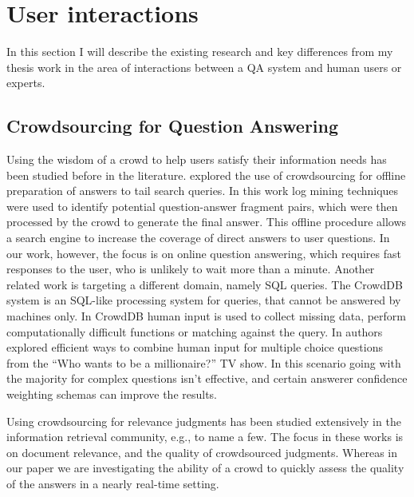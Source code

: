 \section{User interactions}
\label{sec:rel_work:user}

In this section I will describe the existing research and key differences from my thesis work in the area of interactions between a QA system and human users or experts.

\subsection{Crowdsourcing for Question Answering}
\label{sec:rel_work:user:crowdsourcing}

Using the wisdom of a crowd to help users satisfy their information needs has been studied before in the literature.
\cite{bernstein2012direct} explored the use of crowdsourcing for offline preparation of answers to tail search queries.
In this work log mining techniques were used to identify potential question-answer fragment pairs, which were then processed by the crowd to generate the final answer.
This offline procedure allows a search engine to increase the coverage of direct answers to user questions.
In our work, however, the focus is on online question answering, which requires fast responses to the user, who is unlikely to wait more than a minute.
Another related work is targeting a different domain, namely SQL queries.
The CrowdDB system \cite{franklin2011crowddb} is an SQL-like processing system for queries, that cannot be answered by machines only.
In CrowdDB human input is used to collect missing data, perform computationally difficult functions or matching against the query.
In \cite{aydin2014crowdsourcing} authors explored efficient ways to combine human input for multiple choice questions from the ``Who wants to be a millionaire?'' TV show.
In this scenario going with the majority for complex questions isn't effective, and certain answerer confidence weighting schemas can improve the results.  

Using crowdsourcing for relevance judgments has been studied extensively in the information retrieval community, e.g., \cite{Alonso:2008:CRE:1480506.1480508,alonso2011design,grady2010crowdsourcing} to name a few.
The focus in these works is on document relevance, and the quality of crowdsourced judgments.
Whereas in our paper we are investigating the ability of a crowd to quickly assess the quality of the answers in a nearly real-time setting.

